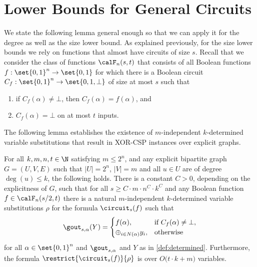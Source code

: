 \section{Lower Bounds for General Circuits}
\label{sec:demorgan-LB}

We state the following lemma general enough so that we can apply it
for the degree as well as the size lower bound. As explained
previously, for the size lower bounds we rely on functions that almost
have circuits of size $s$. Recall that we consider the class of
functions $\calF_n(s,t)$ that consists of all Boolean functions
$f: \set{0,1}^n \rightarrow \set{0,1}$ for which there is a Boolean
circuit $C_f: \set{0,1}^n \rightarrow \set{0, 1, \bot}$ of size at most
$s$ such that
\begin{enumerate}
\item if $C_f(\alpha) \neq \bot$, then $C_f(\alpha) = f(\alpha)$, and
\item $C_f(\alpha) = \bot$ on at most $t$ inputs.
\end{enumerate}
The following lemma establishes the existence of $m$-independent
$k$-deter\-mined variable substitutions that result in XOR-CSP instances
over explicit graphs.

\begin{lemma}
  \label{lem:restriction}
  For all $k, m, n, t \in \N$ satisfying $m \le 2^n$, and any explicit
  bipartite graph $G = (U, V, E)$ such that $|U| = 2^n$, $|V| = m$ and
  all $u \in U$ are of degree $\deg(u) \le k$, the following holds.
  There is a constant $C > 0$, depending on the explicitness of $G$,
  such that for all $s \ge C \cdot m \cdot n^C\cdot k^C$ and any
  Boolean function $f \in \calF_n(s/2,t)$ there is a natural
  $m$-independent $k$-determined variable substitutions $\rho$ for the
  formula $\circuit_s(f)$ such that
  \begin{align*}
    \gout_{s, \alpha}(Y) =
    \begin{cases}
      f(\alpha), &\text{if~} C_f(\alpha) \neq \bot,\\
      \oplus_{i \in N(\alpha)} y_i, &\text{otherwise}
    \end{cases}
  \end{align*}
  for all $\alpha \in \set{0,1}^n$ and $\gout_{s, \alpha}$ and $Y$
  as in \cref{def:determined}.  Furthermore, the formula $\restrict{\circuit_s(f)}{\rho}$ is over
  $O\big(t \cdot k + m\big)$ variables.
\end{lemma}


